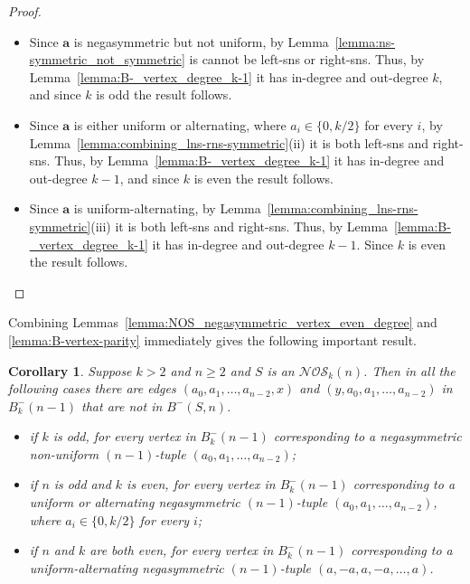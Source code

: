 \documentclass[a4paper,11pt]{article}
\theoremstyle{plain}
\newtheorem{corollary}[lemma]{Corollary}
\theoremstyle{definition}
\theoremstyle{remark}
\begin{document}
\begin{proof}
\begin{itemize}
\item[i)] Since $\mathbf{a}$ is negasymmetric but not uniform, by
    Lemma~\ref{lemma:ns-symmetric_not_symmetric} is cannot be left-sns or right-sns.
     Thus, by Lemma~\ref{lemma:B-_vertex_degree_k-1} it has in-degree and out-degree $k$, and
     since $k$ is odd the result follows.
\item[ii)] Since $\mathbf{a}$ is either uniform or alternating, where $a_i\in\{0,k/2\}$ for
    every $i$, by Lemma~\ref{lemma:combining_lns-rns-symmetric}(ii) it is both left-sns and
    right-sns. Thus, by Lemma~\ref{lemma:B-_vertex_degree_k-1} it has in-degree and out-degree
    $k-1$, and since $k$ is even the result follows.
\item[iii)] Since $\mathbf{a}$ is uniform-alternating, by
    Lemma~\ref{lemma:combining_lns-rns-symmetric}(iii) it is both left-sns and right-sns. Thus,
    by Lemma~\ref{lemma:B-_vertex_degree_k-1} it has in-degree and out-degree $k-1$. Since $k$
    is even the result follows.

\end{itemize}
\end{proof}

Combining Lemmas~\ref{lemma:NOS_negasymmetric_vertex_even_degree} and \ref{lemma:B-vertex-parity}
immediately gives the following important result.

\begin{corollary}  \label{corollary:excluded-tuples-by-parity}
Suppose $k>2$ and $n\geq2$ and $S$ is an $\mathcal{NOS}_k(n)$. Then in all the following cases
there are edges $(a_0,a_1,\ldots,a_{n-2},x)$ and $(y,a_0,a_1,\ldots,a_{n-2})$ in $B^-_k(n-1)$
that are not in $B^-(S,n)$.
\begin{itemize}
\item[i)] if $k$ is odd, for every vertex in $B^-_k(n-1)$ corresponding to a negasymmetric
    non-uniform $(n-1)$-tuple $(a_0,a_1,\ldots,a_{n-2})$;
\item[ii)] if $n$ is odd and $k$ is even, for every vertex in $B^-_k(n-1)$ corresponding to a
    uniform or alternating negasymmetric $(n-1)$-tuple $(a_0,a_1,\ldots,a_{n-2})$, where
    $a_i\in\{0,k/2\}$ for every $i$;
\item[iii)] if $n$ and $k$ are both even, for every vertex in $B^-_k(n-1)$ corresponding to a
    uniform-alternating negasymmetric $(n-1)$-tuple $(a,-a,a,-a,\dots,a)$.
\end{itemize}
\end{corollary}
\end{document}
